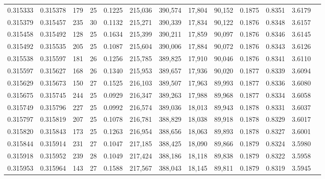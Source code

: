 \begin{tabular}{rrrrrrrrrrrrr}
0.315333 & 0.315378 &   179 &  25 &                                     0.1225 & 215,036 & 390,574 &  17,804 &  90,152 & 0.1875 & 0.8351 & 3.6179 \\
0.315379 & 0.315457 &   235 &  30 &                                     0.1132 & 215,271 & 390,339 &  17,834 &  90,122 & 0.1876 & 0.8348 & 3.6157 \\
0.315458 & 0.315492 &   128 &  25 &                                     0.1634 & 215,399 & 390,211 &  17,859 &  90,097 & 0.1876 & 0.8346 & 3.6145 \\
0.315492 & 0.315535 &   205 &  25 &                                     0.1087 & 215,604 & 390,006 &  17,884 &  90,072 & 0.1876 & 0.8343 & 3.6126 \\
0.315538 & 0.315597 &   181 &  26 &                                     0.1256 & 215,785 & 389,825 &  17,910 &  90,046 & 0.1876 & 0.8341 & 3.6110 \\
0.315597 & 0.315627 &   168 &  26 &                                     0.1340 & 215,953 & 389,657 &  17,936 &  90,020 & 0.1877 & 0.8339 & 3.6094 \\
0.315629 & 0.315673 &   150 &  27 &                                     0.1525 & 216,103 & 389,507 &  17,963 &  89,993 & 0.1877 & 0.8336 & 3.6080 \\
0.315675 & 0.315745 &   244 &  25 &                                     0.0929 & 216,347 & 389,263 &  17,988 &  89,968 & 0.1877 & 0.8334 & 3.6058 \\
0.315749 & 0.315796 &   227 &  25 &                                     0.0992 & 216,574 & 389,036 &  18,013 &  89,943 & 0.1878 & 0.8331 & 3.6037 \\
0.315797 & 0.315819 &   207 &  25 &                                     0.1078 & 216,781 & 388,829 &  18,038 &  89,918 & 0.1878 & 0.8329 & 3.6017 \\
0.315820 & 0.315843 &   173 &  25 &                                     0.1263 & 216,954 & 388,656 &  18,063 &  89,893 & 0.1878 & 0.8327 & 3.6001 \\
0.315844 & 0.315914 &   231 &  27 &                                     0.1047 & 217,185 & 388,425 &  18,090 &  89,866 & 0.1879 & 0.8324 & 3.5980 \\
0.315918 & 0.315952 &   239 &  28 &                                     0.1049 & 217,424 & 388,186 &  18,118 &  89,838 & 0.1879 & 0.8322 & 3.5958 \\
0.315953 & 0.315964 &   143 &  27 &                                     0.1588 & 217,567 & 388,043 &  18,145 &  89,811 & 0.1879 & 0.8319 & 3.5945 \\

\end{tabular}
